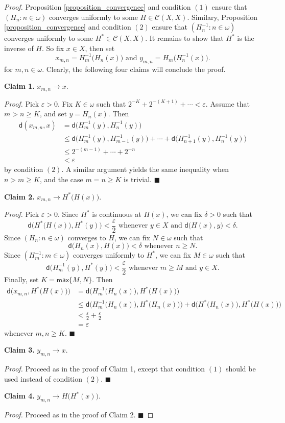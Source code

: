 \documentclass[10pt,a4paper]{amsart}
\newcommand{\CC}{\mathcal{C}}
\newcommand{\di}{\mathsf{d}}
\newcommand{\maxi}{\mathsf{max}}
\begin{document}
\begin{proof}
Proposition \ref{proposition_convergence} and condition $(1)$ ensure that $(H_n:n\in\omega)$ converges uniformly to some $H\in\CC(X,X)$. Similary, Proposition \ref{proposition_convergence} and condition $(2)$ ensure that $(H^{-1}_n:n\in\omega)$ converges uniformly to some $H^\ast\in\CC(X,X)$. It remains to show that $H^\ast$ is the inverse of $H$. So fix $x\in X$, then set
$$
x_{m,n}=H_m^{-1}\big(H_n(x)\big)\text{ and }y_{m,n}=H_m\big(H_n^{-1}(x)\big).
$$
for $m,n\in\omega$. Clearly, the following four claims will conclude the proof.

\noindent\textbf{Claim 1.} $x_{m,n}\to x$.

\noindent\textit{Proof.} Pick $\varepsilon >0$. Fix $K\in\omega$ such that $2^{-K}+2^{-(K+1)}+\cdots <\varepsilon$. Assume that $m>n\geq K$, and set $y=H_n(x)$. Then
\begin{align}
\di(x_{m,n},x)&= \di\big(H_m^{-1}(y),H_n^{-1}(y)\big)\nonumber\\
&\leq\di\big(H_m^{-1}(y),H_{m-1}^{-1}(y)\big)+\cdots +\di\big(H_{n+1}^{-1}(y),H_n^{-1}(y)\big)\nonumber\\
&\leq 2^{-(m-1)}+\cdots +2^{-n}\nonumber\\
&<\varepsilon\nonumber
\end{align}
by condition $(2)$. A similar argument yields the same inequality when $n>m\geq K$, and the case $m=n\geq K$ is trivial. $\blacksquare$

\noindent\textbf{Claim 2.} $x_{m,n}\to H^\ast\big(H(x)\big)$.

\noindent\textit{Proof.} Pick $\varepsilon >0$. Since $H^\ast$ is continuous at $H(x)$, we can fix $\delta >0$ such that
$$
\di\Big(H^\ast\big(H(x)\big),H^\ast(y)\Big)<\frac{\varepsilon}{2}\text{ whenever }y\in X\text{ and }\di\big(H(x),y\big)<\delta.
$$
Since $(H_n:n\in\omega)$ converges to $H$, we can fix $N\in\omega$ such that
$$
\di\big(H_n(x),H(x)\big)<\delta\text{ whenever }n\geq N.
$$
Since $(H^{-1}_m:m\in\omega)$ converges uniformly to $H^\ast$, we can fix $M\in\omega$ such that
$$
\di\big(H^{-1}_m(y),H^\ast(y)\big)<\frac{\varepsilon}{2}\text{ whenever }m\geq M\text{ and }y\in X.
$$
Finally, set $K=\maxi\{M,N\}$. Then
\begin{align}
\di\Big(x_{m,n},H^\ast\big(H(x)\big)\Big)&=\di\Big(H_m^{-1}\big(H_n(x)\big),H^\ast\big(H(x)\big)\Big)\nonumber\\
&\leq\di\Big(H_m^{-1}\big(H_n(x)\big),H^\ast\big(H_n(x)\big)\Big)+\di\Big(H^\ast\big(H_n(x)\big),H^\ast\big(H(x)\big)\Big)\nonumber\\
&<\frac{\varepsilon}{2}+\frac{\varepsilon}{2}\nonumber\\
&=\varepsilon\nonumber
\end{align}
whenever $m,n\geq K$. $\blacksquare$

\noindent\textbf{Claim 3.} $y_{m,n}\to x$.

\noindent\textit{Proof.} Proceed as in the proof of Claim 1, except that condition $(1)$ should be used instead of condition $(2)$. $\blacksquare$

\noindent\textbf{Claim 4.} $y_{m,n}\to H\big(H^\ast(x)\big)$.

\noindent\textit{Proof.} Proceed as in the proof of Claim 2. $\blacksquare$
\end{proof}
\end{document}
